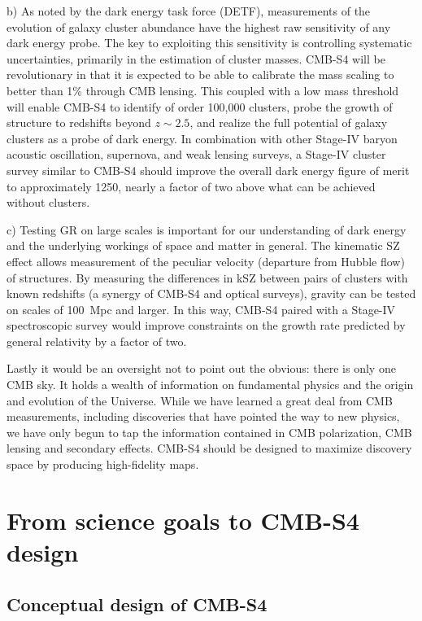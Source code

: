 \begin{enumerate}
{ b) As noted by the dark energy task force (DETF), measurements of the evolution of galaxy cluster abundance have the highest raw sensitivity of any dark energy probe. The key to exploiting this sensitivity is controlling systematic uncertainties, primarily in the estimation of cluster masses. CMB-S4 will be revolutionary in that it is expected to be able to calibrate the mass scaling to better than 1\% through CMB lensing. This coupled with a low mass threshold will enable CMB-S4 to identify of order 100,000 clusters, probe the growth of structure to redshifts beyond $z \sim 2.5$, and realize the full potential of galaxy clusters as a probe of dark energy.  In combination with other Stage-IV baryon acoustic oscillation, supernova, and weak lensing surveys, a Stage-IV cluster survey similar to CMB-S4 should improve the overall dark energy figure of merit to approximately 1250, nearly a factor of two above what can be achieved without clusters. 

 c) Testing GR on large scales is important for our understanding of dark energy and the underlying workings of space and matter in general.  The kinematic SZ effect allows measurement of the peculiar velocity (departure from Hubble flow) of structures. By measuring the differences in kSZ between pairs of clusters with known redshifts (a synergy of CMB-S4 and optical surveys), gravity can be tested on scales of 100~Mpc and larger. In this way, CMB-S4 paired with a Stage-IV spectroscopic survey would improve constraints on the growth rate predicted by general relativity by a factor of two.
 }

\end{enumerate}

Lastly it would be an oversight not to point out the obvious: there is only one CMB sky. It holds a wealth of information on fundamental physics and the origin and evolution of the Universe. While we have learned a great deal from CMB measurements, including discoveries that have pointed the way to new physics, we have only begun to tap the information contained in CMB polarization, CMB lensing and secondary effects. CMB-S4 should be designed to maximize discovery space by producing high-fidelity maps. 

\section{From science goals to CMB-S4 design}


\subsection{Conceptual design of CMB-S4}


